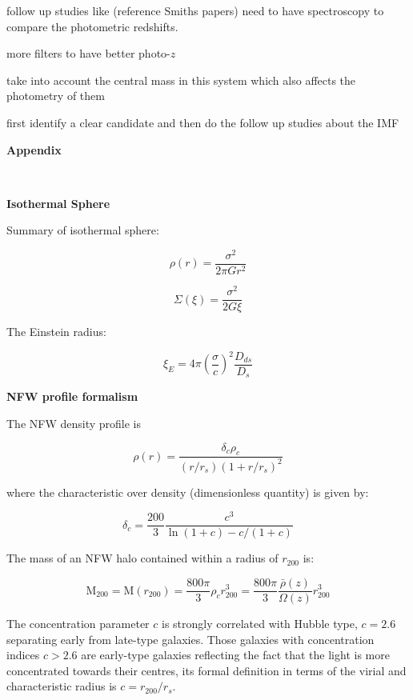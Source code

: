 follow up studies like (reference Smiths papers) need to have spectroscopy to compare the photometric redshifts.

more filters to have better photo-$z$

take into account the central mass in this system which also affects the photometry of them

first identify a clear candidate and then do the follow up studies about the IMF

\newpage
{} 
\begin{appendices}
\textbf{{\LARGE Appendix}}

$\qquad$

\textbf{Isothermal Sphere} 

Summary of isothermal sphere:

\begin{equation}
\rho(r)=\frac{\sigma^2}{2\pi Gr^2}
\end{equation}

\begin{equation}
\Sigma(\xi)=\frac{\sigma^2}{2G\xi}
\end{equation}

The Einstein radius:

\begin{equation}
\xi_{E}=4\pi\left(\frac{\sigma}{c}\right)^{2}\frac{D_{ds}}{D_{s}}
\end{equation} 
 
\textbf{NFW profile formalism}
 
The NFW density profile is 

\begin{equation}
\rho(r)=\frac{\delta_{c}\rho_{c}}{(r/r_{s})(1+r/r_{s})^{2}}
\end{equation}

where the characteristic over density (dimensionless quantity) is given by:

\begin{equation}
\delta_{c}=\frac{200}{3}\frac{c^{3}}{\ln{(1+c)}-c/(1+c)}
\end{equation}

The mass of an NFW halo contained within a radius of $r_{200}$ is:

\begin{equation}
\text{M}_{200}=\text{M}(r_{200})=\frac{800\pi}{3}\rho_{c}r^{3}_{200}=\frac{800\pi}{3}\frac{\bar{\rho}(z)}{\Omega(z)}r^{3}_{200}
\end{equation}

The concentration parameter $c$ is strongly correlated with Hubble type, $c=2.6$ separating early from late-type galaxies. Those galaxies with concentration indices $c>2.6$ are early-type galaxies reflecting the fact that the light is more concentrated towards their centres, its formal definition in terms of the virial and characteristic radius is $c=r_{200}/r_{s}$.


\end{appendices}
